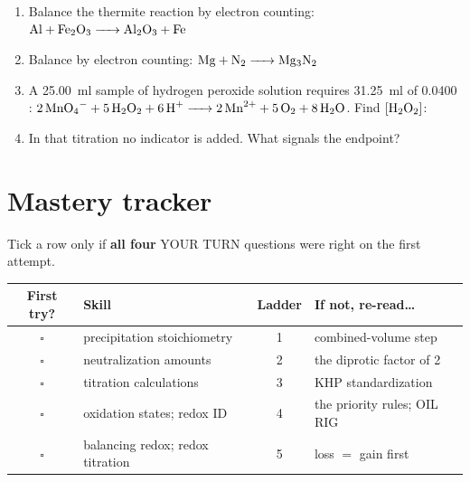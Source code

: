 \documentclass{apchem-worksheet}
\begin{document}
\begin{yourturn}
\begin{enumerate}[leftmargin=*,itemsep=0.5em]
  \item Balance the thermite reaction by electron counting:
        $\ce{Al + Fe2O3 -> Al2O3 + Fe}$ \workspace[1.8cm]
  \item Balance by electron counting: $\ce{Mg + N2 -> Mg3N2}$
        \workspace[1.8cm]
  \item A \SI{25.00}{\milli\litre} sample of hydrogen peroxide solution
        requires \SI{31.25}{\milli\litre} of \SI{0.0400}{\Molar}
        :
        $\ce{2MnO4- + 5H2O2 + 6H+ -> 2Mn^2+ + 5O2 + 8H2O}$.
        Find $[\ce{H2O2}]$: \workspace[2.2cm]
  \item In that titration no indicator is added. What signals the
        endpoint? \workspace[1.6cm]
\end{enumerate}
\end{yourturn}

\section*{\sffamily Mastery tracker}

Tick a row only if \textbf{all four} YOUR TURN questions were right on
the first attempt.

\renewcommand{\arraystretch}{1.35}
\noindent\begin{tabular}{@{}c p{6.6cm} c p{4.4cm}@{}}
\toprule
\textbf{First try?} & \textbf{Skill} & \textbf{Ladder} &
  \textbf{If not, re-read\ldots}\\
\midrule
$\square$ & precipitation stoichiometry & 1 & combined-volume step \\
$\square$ & neutralization amounts & 2 & the diprotic factor of 2 \\
$\square$ & titration calculations & 3 & KHP standardization \\
$\square$ & oxidation states; redox ID & 4 & the priority rules; OIL RIG \\
$\square$ & balancing redox; redox titration & 5 & loss $=$ gain first \\
\bottomrule
\end{tabular}
\end{document}
